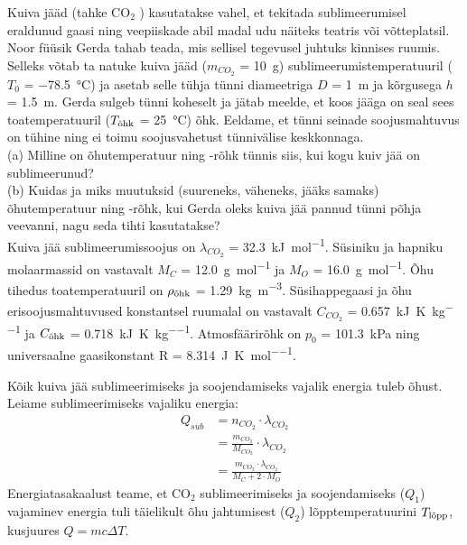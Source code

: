 
Kuiva jääd (tahke CO\(_{2}\) ) kasutatakse vahel, et tekitada sublimeerumisel eraldunud gaasi ning veepiiskade abil madal udu näiteks teatris või võtteplatsil. Noor füüsik Gerda tahab teada, mis sellisel tegevusel juhtuks kinnises ruumis. Selleks võtab ta natuke kuiva jääd (\(m_{CO_2}\) = \SI{10}{\gram}) sublimeerumistemperatuuril (\(T_{0}\) = \SI{-78,5}{\degreeCelsius}) ja asetab selle tühja tünni diameetriga \(D\) = \SI{1}{\meter} ja kõrgusega \(h\) = \SI{1,5}{\metre}. Gerda sulgeb tünni koheselt ja jätab meelde, et koos jääga on seal sees toatemperatuuril (\(T_{\textup{õhk}}\) = \SI{25}{\degreeCelsius}) õhk. Eeldame, et tünni seinade soojusmahtuvus on tühine ning ei toimu soojusvahetust tünnivälise keskkonnaga.
\\(a) Milline on õhutemperatuur ning -rõhk tünnis siis, kui kogu kuiv jää on sublimeerunud?
\\(b) Kuidas ja miks muutuksid (suureneks, väheneks, jääks samaks) õhutemperatuur ning -rõhk, kui Gerda oleks kuiva jää pannud tünni põhja veevanni, nagu seda tihti kasutatakse?\\
Kuiva jää sublimeerumissoojus on \(\lambda_{CO_2}\) = \SI{32,3}{\kilo\joule\per\mole}. Süsiniku ja hapniku molaarmassid on vastavalt \(M_C\) = \SI{12,0}{\gram\per\mole} ja \(M_O\) = \SI{16,0}{\gram\per\mole}. Õhu tihedus toatemperatuuril on \(\rho_{\textup{õhk}}\) = \SI{1,29}{\kilo\gram\per\metre\cubed}. Süsihappegaasi ja õhu erisoojusmahtuvused konstantsel ruumalal on vastavalt \(C_{CO_{2}}\) = \SI{0,657}{\kilo\joule\per\kelvin\per\kilo\gram} ja \(C_{\textup{õhk}}\) = \SI{0,718}{\kilo\joule\per\kelvin\per\kilo\gram}. Atmosfäärirõhk on \(p_{0}\) = \SI{101,3}{\kilo\pascal} ning universaalne gaasikonstant R = \SI{8,314}{\joule\per\kelvin\per\mole}.






\hint

\solu
Kõik kuiva jää sublimeerimiseks ja soojendamiseks vajalik energia tuleb õhust. Leiame sublimeerimiseks vajaliku energia:
\begin{align*}
    Q_{sub} &= n_{CO_2} \cdot \lambda_{CO_2}\\
    &= \frac{m_{CO_2}}{M_{CO_2}} \cdot \lambda_{CO_2}\\
    &= \frac{m_{CO_2}\cdot \lambda_{CO_2}}{M_{C} + 2\cdot M_{O}}
\end{align*}
Energiatasakaalust teame, et CO\(_2\) sublimeerimiseks ja soojendamiseks (\(Q_1\)) vajaminev energia tuli täielikult õhu jahtumisest (\(Q_2\)) lõpptemperatuurini \(T_{\textup{lõpp}}\), kusjuures \(Q = mc\Delta T\).

